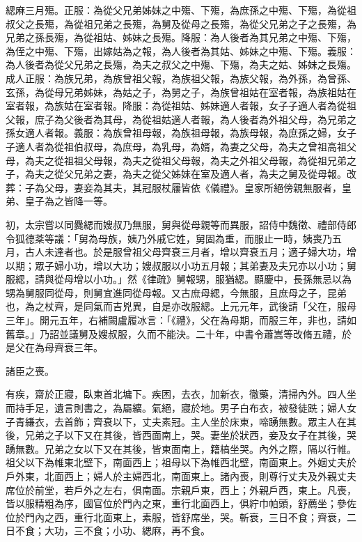 \begin{pinyinscope}
 緦麻三月殤。正服：為從父兄弟姊妹之中殤、下殤，為庶孫之中殤、下殤，為從祖叔父之長殤，為從祖兄弟之長殤，為舅及從母之長殤，為從父兄弟之子之長殤，為兄弟之孫長殤，為從祖姑、姊妹之長殤。降服：為人後者為其兄弟之中殤、下殤，為侄之中殤、下殤，出嫁姑為之報，為人後者為其姑、姊妹之中殤、下殤。義服：為人後者為從父兄弟之長殤，為夫之叔父之中殤、下殤，為夫之姑、姊妹之長殤。成人正服：為族兄弟，為族曾祖父報，為族祖父報，為族父報，為外孫，為曾孫、玄孫，為從母兄弟姊妹，為姑之子，為舅之子，為族曾祖姑在室者報，為族祖姑在室者報，為族姑在室者報。降服：為從祖姑、姊妹適人者報，女子子適人者為從祖父報，庶子為父後者為其母，為從祖姑適人者報，為人後者為外祖父母，為兄弟之孫女適人者報。義服：為族曾祖母報，為族祖母報，為族母報，為庶孫之婦，女子子適人者為從祖伯叔母，為庶母，為乳母，為婿，為妻之父母，為夫之曾祖高祖父母，為夫之從祖祖父母報，為夫之從祖父母報，為夫之外祖父母報，為從祖兄弟之子，為夫之從父兄弟之妻，為夫之從父姊妹在室及適人者，為夫之舅及從母報。改葬：子為父母，妻妾為其夫，其冠服杖屨皆依《儀禮》。皇家所絕傍親無服者，皇弟、皇子為之皆降一等。



 初，太宗嘗以同爨緦而嫂叔乃無服，舅與從母親等而異服，詔侍中魏徵、禮部侍郎令狐德棻等議：「舅為母族，姨乃外戚它姓，舅固為重，而服止一時，姨喪乃五月，古人未達者也。於是服曾祖父母齊衰三月者，增以齊衰五月；適子婦大功，增以期；眾子婦小功，增以大功；嫂叔服以小功五月報；其弟妻及夫兄亦以小功；舅服緦，請與從母增以小功。」然《律疏》舅報甥，服猶緦。顯慶中，長孫無忌以為甥為舅服同從母，則舅宜進同從母報。又古庶母緦，今無服，且庶母之子，昆弟也，為之杖齊，是同氣而吉兇異，自是亦改服緦。上元元年，武後請「父在，服母三年」。開元五年，右補闕盧履冰言：「《禮》，父在為母期，而服三年，非也，請如舊章。」乃詔並議舅及嫂叔服，久而不能決。二十年，中書令蕭嵩等改脩五禮，於是父在為母齊衰三年。



 諸臣之喪。



 有疾，齋於正寢，臥東首北墉下。疾困，去衣，加新衣，徹藥，清掃內外。四人坐而持手足，遺言則書之，為屬纊。氣絕，寢於地。男子白布衣，被發徒跣；婦人女子青縑衣，去首飾；齊衰以下，丈夫素冠。主人坐於床東，啼踴無數。眾主人在其後，兄弟之子以下又在其後，皆西面南上，哭。妻坐於狀西，妾及女子在其後，哭踴無數。兄弟之女以下又在其後，皆東面南上，籍槁坐哭。內外之際，隔以行帷。祖父以下為帷東北壁下，南面西上；祖母以下為帷西北壁，南面東上。外姻丈夫於戶外東，北面西上；婦人於主婦西北，南面東上。諸內喪，則尊行丈夫及外親丈夫席位於前堂，若戶外之左右，俱南面。宗親戶東，西上；外親戶西，東上。凡喪，皆以服精粗為序，國官位於門內之東，重行北面西上，俱紵巾帕頭，舒薦坐；參佐位於門內之西，重行北面東上，素服，皆舒席坐，哭。斬衰，三日不食；齊衰，二日不食；大功，三不食；小功、緦麻，再不食。




\end{pinyinscope}
